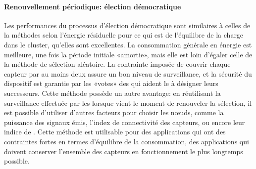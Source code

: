 \paragraph{Renouvellement périodique: élection démocratique}
Les performances du processus d'élection démocratique sont similaires à celles de la méthodes selon l'énergie résiduelle pour ce qui est de l'équilibre de la charge dans le cluster, \cad qu'elles sont excellentes.
La consommation générale en énergie est meilleure, une fois la période initiale «amortie», mais elle est loin d'égaler celle de la méthode de sélection aléatoire.
La contrainte imposée de couvrir chaque capteur par au moins deux \cns assure un bon niveau de surveillance, et la sécurité du dispositif est garantie par les «votes» des \cns qui aident le \ch à désigner leurs successeurs.
Cette méthode possède un autre avantage: en réutilisant la surveillance effectuée par les \cns lorsque vient le moment de renouveler la sélection, il est possible d'utiliser d'autres facteurs pour choisir les nœuds, comme la puissance des signaux émis, l'index de connectivité des capteurs, ou encore leur indice de .
Cette méthode est utilisable pour des applications qui ont des contraintes fortes en termes d'équilibre de la consommation, \cad des applications qui doivent conserver l'ensemble des capteurs en fonctionnement le plus longtemps possible.

